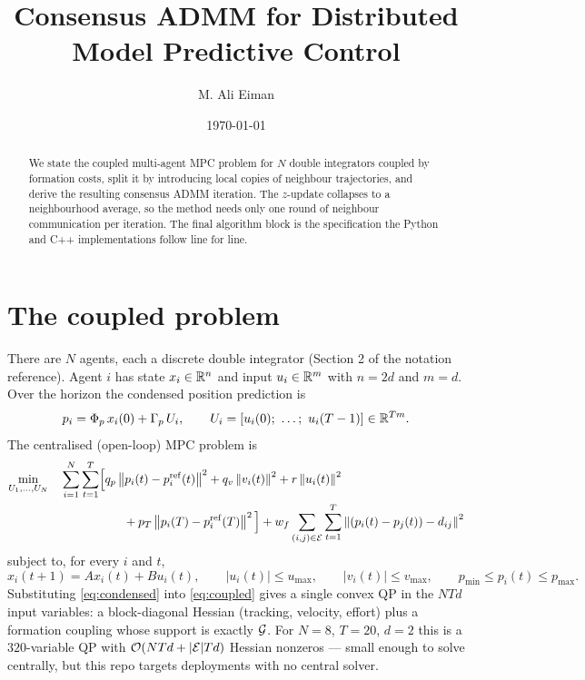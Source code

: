 \documentclass[11pt]{article}
\title{Consensus ADMM for Distributed Model Predictive Control}
\author{M. Ali Eiman}
\date{\today}
\begin{document}
\maketitle

\begin{abstract}
We state the coupled multi-agent MPC problem for $N$ double integrators coupled by formation
costs, split it by introducing local copies of neighbour trajectories, and derive the
resulting consensus ADMM iteration. The $z$-update collapses to a neighbourhood average, so
the method needs only one round of neighbour communication per iteration. The final
algorithm block is the specification the Python and C++ implementations follow line for
line.
\end{abstract}

\section{The coupled problem}

There are $N$ agents, each a discrete double integrator (Section 2 of the notation
reference). Agent $i$ has state $x_i \in \mathbb{R}^n$ and input $u_i \in \mathbb{R}^m$ with $n = 2d$ and
$m = d$. Over the horizon the condensed position prediction is
\begin{equation}
p_i = \Phi_p\, x_i(0) + \Gamma_p\, U_i,
\qquad
U_i = [u_i(0);\ \dots;\ u_i(T-1)] \in \mathbb{R}^{Tm}.
\label{eq:condensed}
\end{equation}
The centralised (open-loop) MPC problem is
\begin{equation}
\begin{aligned}
\min_{U_1,\dots,U_N} \quad
\sum_{i=1}^N \sum_{t=1}^T &\Big[
  q_p \left\lVert p_i(t) - p_i^{\mathrm{ref}}(t) \right\rVert^2
+ q_v \left\lVert v_i(t) \right\rVert^2
+ r \left\lVert u_i(t) \right\rVert^2 \\
&\qquad + p_T \left\lVert p_i(T) - p_i^{\mathrm{ref}}(T) \right\rVert^2 \Big]
+ w_f \sum_{(i,j)\in\mathcal{E}} \sum_{t=1}^T \left\lVert (p_i(t) - p_j(t)) - d_{ij} \right\rVert^2
\end{aligned}
\label{eq:coupled}
\end{equation}
subject to, for every $i$ and $t$,
\begin{equation}
x_i(t+1) = A x_i(t) + B u_i(t),
\qquad
|u_i(t)| \le u_{\max},
\qquad
|v_i(t)| \le v_{\max},
\qquad
p_{\min} \le p_i(t) \le p_{\max}.
\end{equation}
Substituting \eqref{eq:condensed} into \eqref{eq:coupled} gives a single convex QP in the
$N T d$ input variables: a block-diagonal Hessian (tracking, velocity, effort) plus a
formation coupling whose support is exactly $\mathcal{G}$. For $N = 8$, $T = 20$, $d = 2$ this is
a $320$-variable QP with $\mathcal O(NTd + |\mathcal{E}| T d)$ Hessian nonzeros --- small enough
to solve centrally, but this repo targets deployments with no central solver.
\end{document}
